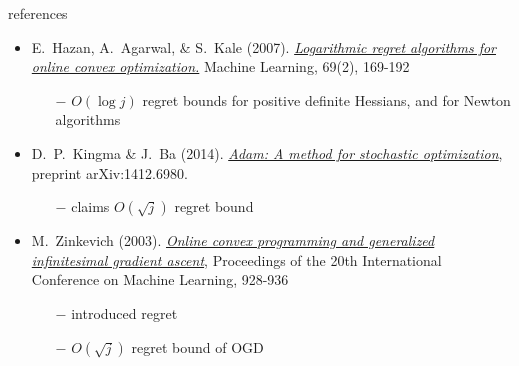 \documentclass[svgnames,
               hyperref={colorlinks,citecolor=DeepPink4,linkcolor=FireBrick,urlcolor=Maroon},
               usepdftitle=false]  %
               {beamer}
\begin{document}
\begin{frame}{references}

\begin{itemize}
\footnotesize
\item E.~Hazan, A.~Agarwal, \& S.~Kale (2007).  \href{https://link.springer.com/content/pdf/10.1007/s10994-007-5016-8.pdf}{\emph{Logarithmic regret algorithms for online convex optimization.}} Machine Learning, 69(2), 169-192
    \begin{itemize}
    \scriptsize
    \item[$-$] $O(\log j)$ regret bounds for positive definite Hessians, and for Newton algorithms
    \end{itemize}
\item D.~P.~Kingma \& J.~Ba (2014). \href{https://arxiv.org/abs/1412.6980}{\emph{Adam: A method for stochastic optimization}}, preprint arXiv:1412.6980.
    \begin{itemize}
    \scriptsize
    \item[$-$] claims $O(\sqrt{j})$ regret bound
    \end{itemize}
\item M.~Zinkevich (2003). \href{https://www.aaai.org/Papers/ICML/2003/ICML03-120.pdf}{\emph{Online convex programming and generalized infinitesimal gradient ascent}}, Proceedings of the 20th International Conference on Machine Learning, 928-936
    \begin{itemize}
    \scriptsize
    \item[$-$] introduced regret
    \item[$-$] $O(\sqrt{j})$ regret bound of OGD
    \end{itemize}
\end{itemize}
\end{frame}
\end{document}
